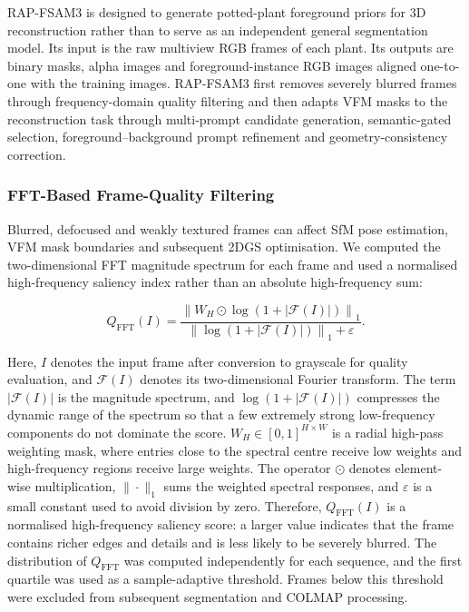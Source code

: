 \documentclass[a4paper]{cas-sc}
\begin{document}
RAP-FSAM3 is designed to generate potted-plant foreground priors for 3D reconstruction rather than to serve as an independent general segmentation model. Its input is the raw multiview RGB frames of each plant. Its outputs are binary masks, alpha images and foreground-instance RGB images aligned one-to-one with the training images. RAP-FSAM3 first removes severely blurred frames through frequency-domain quality filtering and then adapts VFM masks to the reconstruction task through multi-prompt candidate generation, semantic-gated selection, foreground--background prompt refinement and geometry-consistency correction.

\subsubsection{FFT-Based Frame-Quality Filtering}\label{sec:fft-based-frame-quality-filtering}

Blurred, defocused and weakly textured frames can affect SfM pose estimation, VFM mask boundaries and subsequent 2DGS optimisation. We computed the two-dimensional FFT magnitude spectrum for each frame and used a normalised high-frequency saliency index rather than an absolute high-frequency sum:

\[
Q_{\text{FFT}}(I)=
\frac{\left\| W_H\odot \log\left(1+\left|\mathcal{F}(I)\right|\right)\right\|_1}
{\left\| \log\left(1+\left|\mathcal{F}(I)\right|\right)\right\|_1+\varepsilon} .
\]

Here, \(I\) denotes the input frame after conversion to grayscale for quality evaluation, and \(\mathcal{F}(I)\) denotes its two-dimensional Fourier transform. The term \(|\mathcal{F}(I)|\) is the magnitude spectrum, and \(\log(1+|\mathcal{F}(I)|)\) compresses the dynamic range of the spectrum so that a few extremely strong low-frequency components do not dominate the score. \(W_H\in[0,1]^{H\times W}\) is a radial high-pass weighting mask, where entries close to the spectral centre receive low weights and high-frequency regions receive large weights. The operator \(\odot\) denotes element-wise multiplication, \(\|\cdot\|_1\) sums the weighted spectral responses, and \(\varepsilon\) is a small constant used to avoid division by zero. Therefore, \(Q_{\text{FFT}}(I)\) is a normalised high-frequency saliency score: a larger value indicates that the frame contains richer edges and details and is less likely to be severely blurred. The distribution of \(Q_{\text{FFT}}\) was computed independently for each sequence, and the first quartile was used as a sample-adaptive threshold. Frames below this threshold were excluded from subsequent segmentation and COLMAP processing.
\end{document}
